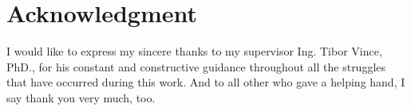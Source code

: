 \documentclass[journal]{IEEEtran}
\begin{document}

%


%

\newpage
\section*{Acknowledgment}
I would like to express my sincere thanks to my supervisor Ing. Tibor Vince,
PhD., for his constant and constructive guidance throughout all the struggles that
have occurred during this work. And to all other who gave a helping hand, I say
thank you very much, too.



\printbibliography



\end{document}
